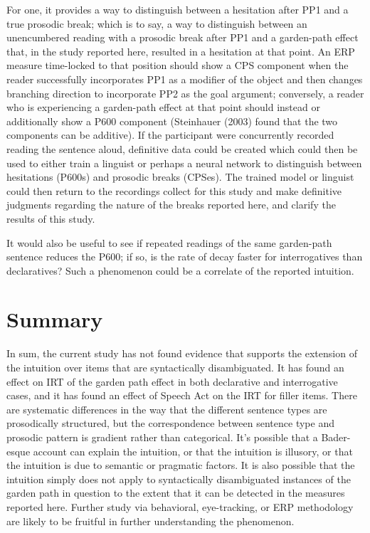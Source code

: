 \documentclass[12pt,oneside]{book}
\begin{document}
For one, it provides a way to distinguish between a hesitation after PP1 and a true prosodic break; which is to say, a way to distinguish between an unencumbered reading with a prosodic break after PP1 and a garden-path effect that, in the study reported here, resulted in a hesitation at that point. An ERP measure time-locked to that position should show a CPS component when the reader successfully incorporates PP1 as a modifier of the object and then changes branching direction to incorporate PP2 as the goal argument; conversely, a reader who is experiencing a garden-path effect at that point should instead or additionally show a P600 component (Steinhauer (2003) found that the two components can be additive). If the participant were concurrently recorded reading the sentence aloud, definitive data could be created which could then be used to either train a linguist or perhaps a neural network to distinguish between hesitations (P600s) and prosodic breaks (CPSes). The trained model or linguist could then return to the recordings collect for this study and make definitive judgments regarding the nature of the breaks reported here, and clarify the results of this study.

It would also be useful to see if repeated readings of the same garden-path sentence reduces the P600; if so, is the rate of decay faster for interrogatives than declaratives? Such a phenomenon could be a correlate of the reported intuition.

\hypertarget{summary}{%
\section{Summary}\label{summary}}

In sum, the current study has not found evidence that supports the extension of the intuition over items that are syntactically disambiguated. It has found an effect on IRT of the garden path effect in both declarative and interrogative cases, and it has found an effect of Speech Act on the IRT for filler items. There are systematic differences in the way that the different sentence types are prosodically structured, but the correspondence between sentence type and prosodic pattern is gradient rather than categorical. It's possible that a Bader-esque account can explain the intuition, or that the intuition is illusory, or that the intuition is due to semantic or pragmatic factors. It is also possible that the intuition simply does not apply to syntactically disambiguated instances of the garden path in question to the extent that it can be detected in the measures reported here. Further study via behavioral, eye-tracking, or ERP methodology are likely to be fruitful in further understanding the phenomenon.
\end{document}
